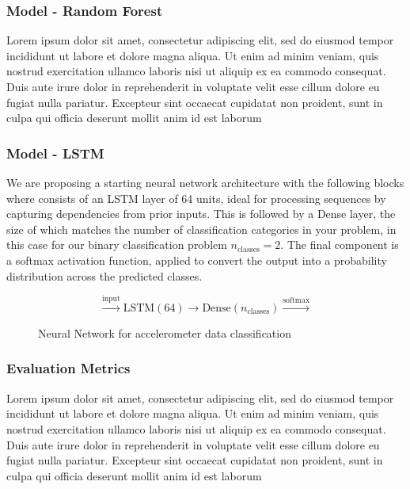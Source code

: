 \documentclass[10pt]{beamer}
\begin{document}
\begin{frame}
  \frametitle{Model - Random Forest}
  \begin{block}{}
    Lorem ipsum dolor sit amet, consectetur adipiscing elit, sed do eiusmod tempor incididunt ut labore et dolore magna aliqua. Ut enim ad minim veniam, quis nostrud exercitation ullamco laboris nisi ut aliquip ex ea commodo consequat. Duis aute irure dolor in reprehenderit in voluptate velit esse cillum dolore eu fugiat nulla pariatur. Excepteur sint occaecat cupidatat non proident, sunt in culpa qui officia deserunt mollit anim id est laborum
  \end{block} 
\end{frame}

\begin{frame}
  \frametitle{Model - LSTM}
  \begin{block}

        We are proposing a starting neural network architecture with the following blocks where consists of an LSTM layer of 64 units, ideal for processing sequences by capturing dependencies from prior inputs. This is followed by a Dense layer, the size of which matches the number of classification categories in your problem, in this case for our binary classification problem \(n_{\text{classes}} = 2\). The final component is a softmax activation function, applied to convert the output into a probability distribution across the predicted classes. 
        \begin{figure}[h]
          \centering
          \[
          \xrightarrow{\text{input}} \boxed{\text{LSTM} (64)} \rightarrow \boxed{\text{Dense} (n_{\text{classes}})} \xrightarrow{\text{softmax}}
          \]
          \caption{Neural Network for accelerometer data classification}
          \label{fig:neuralnetwork}
        \end{figure}
  \end{block} 
\end{frame}

\begin{frame}
  \frametitle{Evaluation Metrics}
  \begin{block}{}
    Lorem ipsum dolor sit amet, consectetur adipiscing elit, sed do eiusmod tempor incididunt ut labore et dolore magna aliqua. Ut enim ad minim veniam, quis nostrud exercitation ullamco laboris nisi ut aliquip ex ea commodo consequat. Duis aute irure dolor in reprehenderit in voluptate velit esse cillum dolore eu fugiat nulla pariatur. Excepteur sint occaecat cupidatat non proident, sunt in culpa qui officia deserunt mollit anim id est laborum
  \end{block} 
\end{frame}
\end{document}
